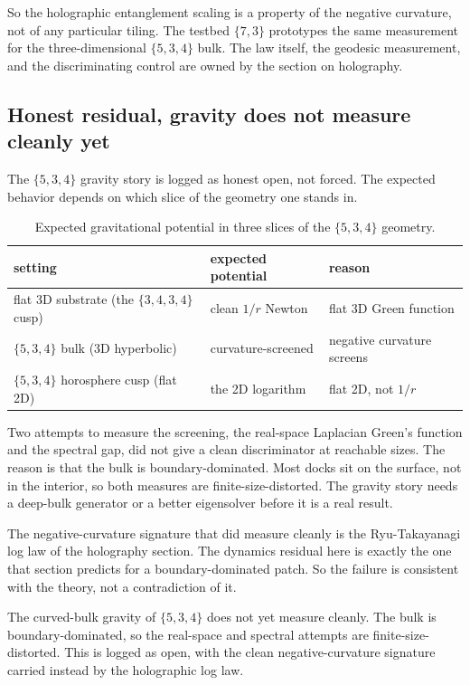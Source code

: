 So the holographic entanglement scaling is a property of the negative curvature, not of any particular tiling. The testbed $\{7,3\}$ prototypes the same measurement for the three-dimensional $\{5,3,4\}$ bulk. The law itself, the geodesic measurement, and the discriminating control are owned by the section on holography.

\subsection{Honest residual, gravity does not measure cleanly yet}

The $\{5,3,4\}$ gravity story is logged as honest open, not forced. The expected behavior depends on which slice of the geometry one stands in.

\begin{table}[ht]
\centering
\begin{tabular}{@{}lll@{}}
\toprule
setting & expected potential & reason \\
\midrule
flat 3D substrate (the $\{3,4,3,4\}$ cusp) & clean $1/r$ Newton & flat 3D Green function \\
$\{5,3,4\}$ bulk (3D hyperbolic) & curvature-screened & negative curvature screens \\
$\{5,3,4\}$ horosphere cusp (flat 2D) & the 2D logarithm & flat 2D, not $1/r$ \\
\bottomrule
\end{tabular}
\caption{Expected gravitational potential in three slices of the $\{5,3,4\}$ geometry.}
\label{tab:gravity-534}
\end{table}

Two attempts to measure the screening, the real-space Laplacian Green's function and the spectral gap, did not give a clean discriminator at reachable sizes. The reason is that the bulk is boundary-dominated. Most docks sit on the surface, not in the interior, so both measures are finite-size-distorted. The gravity story needs a deep-bulk generator or a better eigensolver before it is a real result.

The negative-curvature signature that did measure cleanly is the Ryu-Takayanagi log law of the holography section. The dynamics residual here is exactly the one that section predicts for a boundary-dominated patch. So the failure is consistent with the theory, not a contradiction of it.

\begin{principle}
The curved-bulk gravity of $\{5,3,4\}$ does not yet measure cleanly. The bulk is boundary-dominated, so the real-space and spectral attempts are finite-size-distorted. This is logged as open, with the clean negative-curvature signature carried instead by the holographic log law.
\end{principle}

